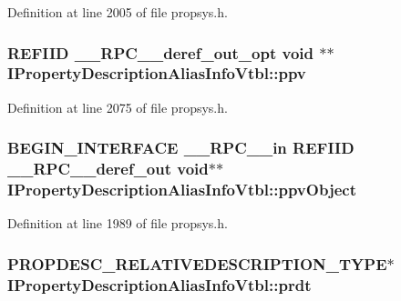 Definition at line 2005 of file propsys.\+h.

\subsubsection[{\texorpdfstring{ppv}{ppv}}]{ {\bf R\+E\+F\+I\+ID} {\bf \+\_\+\+\_\+\+R\+P\+C\+\_\+\+\_\+deref\+\_\+out\+\_\+opt} {\bf void} $\ast$$\ast$ I\+Property\+Description\+Alias\+Info\+Vtbl\+::ppv}\hypertarget{struct_i_property_description_alias_info_vtbl_ab924dd7301f9538f70ae9697006dea89}{}\label{struct_i_property_description_alias_info_vtbl_ab924dd7301f9538f70ae9697006dea89}


Definition at line 2075 of file propsys.\+h.

\subsubsection[{\texorpdfstring{ppv\+Object}{ppvObject}}]{\setlength{\rightskip}{0pt plus 5cm}B\+E\+G\+I\+N\+\_\+\+I\+N\+T\+E\+R\+F\+A\+CE {\bf \+\_\+\+\_\+\+R\+P\+C\+\_\+\+\_\+in} {\bf R\+E\+F\+I\+ID} {\bf \+\_\+\+\_\+\+R\+P\+C\+\_\+\+\_\+deref\+\_\+out} {\bf void}$\ast$$\ast$ I\+Property\+Description\+Alias\+Info\+Vtbl\+::ppv\+Object}\hypertarget{struct_i_property_description_alias_info_vtbl_a406225fe8459ccaacfc217dcd87ea058}{}\label{struct_i_property_description_alias_info_vtbl_a406225fe8459ccaacfc217dcd87ea058}


Definition at line 1989 of file propsys.\+h.

\subsubsection[{\texorpdfstring{prdt}{prdt}}]{ {\bf P\+R\+O\+P\+D\+E\+S\+C\+\_\+\+R\+E\+L\+A\+T\+I\+V\+E\+D\+E\+S\+C\+R\+I\+P\+T\+I\+O\+N\+\_\+\+T\+Y\+PE}$\ast$ I\+Property\+Description\+Alias\+Info\+Vtbl\+::prdt}\hypertarget{struct_i_property_description_alias_info_vtbl_a6550206ad398b910b557949785835fb5}{}\label{struct_i_property_description_alias_info_vtbl_a6550206ad398b910b557949785835fb5}


